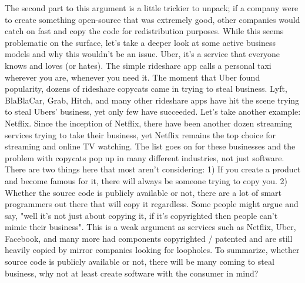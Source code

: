 \documentclass[11pt]{article}
\begin{document}
The second part to this argument is a little trickier to unpack; if a company were to create something open-source that was extremely good, other companies would catch on fast and copy the code for redistribution purposes. While this seems problematic on the surface, let's take a deeper look at some active business models and why this wouldn't be an issue. Uber, it's a service that everyone knows and loves (or hates). The simple rideshare app calls a personal taxi wherever you are, whenever you need it. The moment that Uber found popularity, dozens of rideshare copycats came in trying to steal business. Lyft, BlaBlaCar, Grab, Hitch, and many other rideshare apps have hit the scene trying to steal Ubers' business, yet only few have succeeded. Let's take another example: Netflix. Since the inception of Netflix, there have been another dozen streaming services trying to take their business, yet Netflix remains the top choice for streaming and online TV watching. The list goes on for these businesses and the problem with copycats pop up in many different industries, not just software. There are two things here that most aren't considering: 1) If you create a product and become famous for it, there will always be someone trying to copy you. 2) Whether the source code is publicly available or not, there are a lot of smart programmers out there that will copy it regardless. Some people might argue and say, "well it's not just about copying it, if it's copyrighted then people can't mimic their business". This is a weak argument as services such as Netflix, Uber, Facebook, and many more had components copyrighted / patented and are still heavily copied by mirror companies looking for loopholes. To summarize, whether source code is publicly available or not, there will be many coming to steal business, why not at least create software with the consumer in mind?
\end{document}
